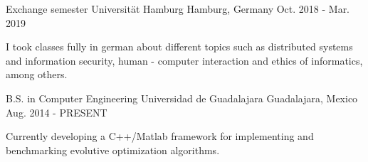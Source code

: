 \begin{cventries}
    \cventry
        {Exchange semester}
        {Universität Hamburg}
        {Hamburg, Germany}
        {Oct. 2018 - Mar. 2019}
        {
            \begin{cvitems}
                \item {I took classes fully in german about different topics such as distributed systems and information security, human - computer interaction and ethics of informatics, among others.}
            \end{cvitems}
        }
    \cventry
        {B.S. in Computer Engineering}
        {Universidad de Guadalajara}
        {Guadalajara, Mexico}
        {Aug. 2014 - PRESENT}
        {
            \begin{cvitems}
                \item {Currently developing a C++/Matlab framework for implementing and benchmarking evolutive optimization algorithms.}
            \end{cvitems}
        }
\end{cventries}
